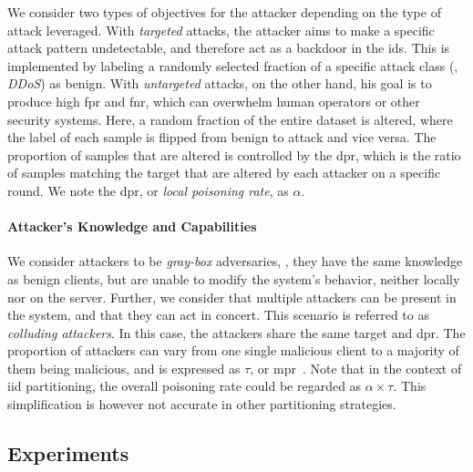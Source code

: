 We consider two types of objectives for the attacker depending on the type of attack leveraged.
With \emph{targeted} attacks, the attacker aims to make a specific attack pattern undetectable, and therefore act as a backdoor in the \gls{ids}.
This is implemented by labeling a randomly selected fraction of a specific attack class (\eg, \emph{DDoS}) as benign.
With \emph{untargeted} attacks, on the other hand, his goal is to produce high \gls{fpr} and \gls{fnr}, which can overwhelm human operators or other security systems.
Here, a random fraction of the entire dataset is altered, where the label of each sample is flipped from benign to attack and vice versa.
The proportion of samples that are altered is controlled by the \gls{dpr}, which is the ratio of samples matching the target that are altered by each attacker on a specific round.
We note the \gls{dpr}, or \emph{local poisoning rate}, as $\alpha$.


\paragraph{Attacker's Knowledge and Capabilities}

We consider attackers to be \emph{gray-box} adversaries, \ie, they have the same knowledge as benign clients, but are unable to modify the system's behavior, neither locally nor on the server.  
Further, we consider that multiple attackers can be present in the system, and that they can act in concert. 
This scenario is referred to as \emph{colluding attackers}.
In this case, the attackers share the same target and \gls{dpr}.
The proportion of attackers can vary from one single malicious client to a majority of them being malicious, and is expressed as $\tau$, or \gls{mpr}~\cite{merzouk_Parameterizingpoisoningattacks_2023}.
Note that in the context of \gls{iid} partitioning, the overall poisoning rate could be regarded as $\alpha \times \tau$.
This simplification is however not accurate in other partitioning strategies.


\subsection{Experiments\label{sec:assess.method.exps}}

